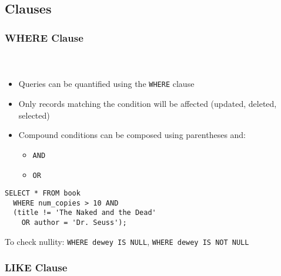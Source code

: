 \documentclass{beamer}
\begin{document}
\subsection{Clauses}

\begin{frame}[fragile]
  \frametitle{WHERE Clause}
  \framesubtitle{~}

\begin{itemize}
  \item Queries can be quantified using the \texttt{WHERE} clause
  \item Only records matching the condition will be affected (updated, deleted, selected)
  \item Compound conditions can be composed using parentheses and:
  \begin{itemize}
    \item \texttt{AND}
    \item \texttt{OR}
  \end{itemize}
\end{itemize}

\begin{verbatim}
SELECT * FROM book 
  WHERE num_copies > 10 AND 
  (title != 'The Naked and the Dead' 
    OR author = 'Dr. Seuss');
\end{verbatim}

To check nullity: \texttt{WHERE dewey IS NULL}, \texttt{WHERE dewey IS NOT NULL}

\end{frame}

\begin{frame}[fragile]
  \frametitle{LIKE Clause}
  \framesubtitle{~}


\end{frame}
\end{document}
